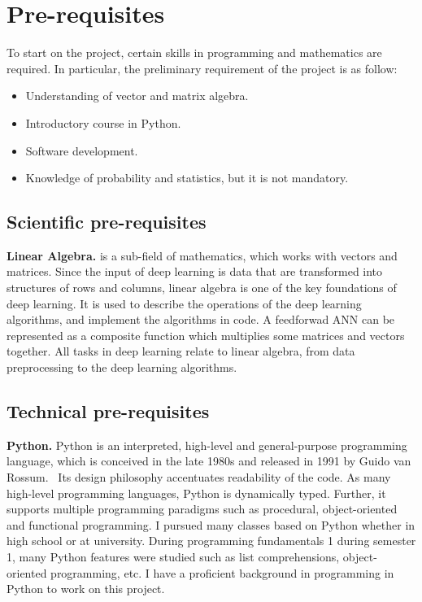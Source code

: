 
\section{Pre-requisites} 

To start on the project, certain skills in programming
and mathematics are required. In particular, the preliminary requirement of
the project is as follow:
\begin{itemize}
        \item Understanding of vector and matrix algebra.
        \item Introductory course in Python.
        \item Software development.
        \item Knowledge of probability and statistics, but it is not
                mandatory.
\end{itemize}

\subsection{Scientific pre-requisites}

\textbf{Linear Algebra.} is a sub-field of mathematics, which works with vectors
and matrices. Since the input of deep learning is data that are transformed into
structures of rows and columns, linear algebra is one of the key foundations of
deep learning. It is used to describe the operations of the deep learning
algorithms, and implement the algorithms in code. A feedforwad ANN can be
represented as a composite function which multiplies some matrices and vectors
together. All tasks in deep learning relate to linear algebra, from data
preprocessing to the deep learning algorithms.~\cite{Goodfellow-et-al-2016}

\subsection{Technical pre-requisites}

\textbf{Python.} Python is an interpreted, high-level and general-purpose
programming language, which is conceived in the late 1980s and released in 1991
by Guido van Rossum.~\cite{PyRo} Its design philosophy accentuates readability
of the code.  As many high-level programming languages, Python is dynamically
typed. Further, it supports multiple programming paradigms such as procedural,
object-oriented and functional programming. I pursued many classes based on
Python whether in high school or at university. During programming fundamentals
1 during semester 1, many Python features were studied such as list
comprehensions, object-oriented programming, etc. I have a proficient
background in programming in Python to work on this project.\\

